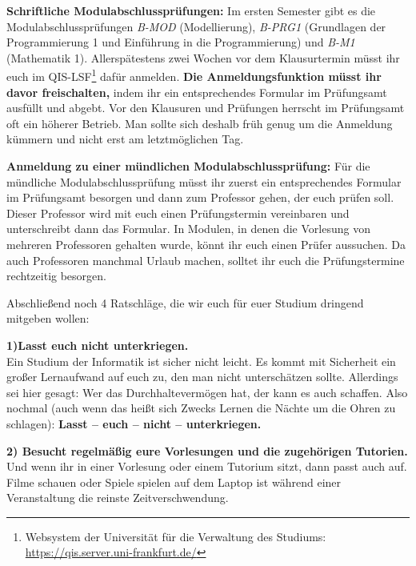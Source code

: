 \textbf{Schriftliche Modulabschlussprüfungen:} Im ersten Semester gibt es die Modulabschlussprüfungen \emph{B-MOD} (Modellierung), \emph{B\hbox{-}PRG1} (Grundlagen der Programmierung 1 und Einführung in die Programmierung) und \emph{B-M1} (Mathematik 1).
Allerspätestens zwei Wochen vor dem Klausurtermin müsst ihr euch im QIS-LSF\footnote{Websystem der Universität für die Verwaltung des Studiums: \href{https://qis.server.uni-frankfurt.de/}{https://qis.server.uni-frankfurt.de/}} dafür anmelden. \textbf{Die Anmeldungsfunktion müsst ihr davor freischalten,} indem ihr ein entsprechendes Formular im Prüfungsamt ausfüllt und abgebt. Vor den Klausuren und Prüfungen herrscht im Prüfungsamt oft ein höherer Betrieb. Man sollte sich deshalb früh genug um die Anmeldung kümmern und nicht erst am letztmöglichen Tag.


\textbf{Anmeldung zu einer mündlichen Modulabschlussprüfung:} Für die mündliche Modulabschlussprüfung müsst ihr zuerst ein entsprechendes Formular im Prüfungsamt besorgen und dann zum Professor gehen, der euch prüfen soll. Dieser Professor wird mit euch einen Prüfungstermin vereinbaren und unterschreibt dann das Formular. In Modulen, in denen die Vorlesung von mehreren Professoren gehalten wurde, könnt ihr euch einen Prüfer aussuchen. Da auch Professoren manchmal Urlaub machen, solltet ihr euch die Prüfungstermine rechtzeitig besorgen.

Abschließend noch 4 Ratschläge, die wir euch für euer Studium dringend mitgeben wollen:

\textbf{1)Lasst euch nicht unterkriegen.}\\
Ein Studium der Informatik ist sicher nicht leicht. Es kommt mit Sicherheit ein großer Lernaufwand auf euch zu, den man nicht unterschätzen sollte. Allerdings sei hier gesagt: Wer das Durchhaltevermögen hat, der kann es auch schaffen.
Also nochmal (auch wenn das heißt sich Zwecks Lernen die Nächte um die Ohren zu schlagen): \textbf{Lasst – euch – nicht – unterkriegen.}

\textbf{2) Besucht regelmäßig eure Vorlesungen und die zugehörigen Tutorien.}\\
Und wenn ihr in einer Vorlesung oder einem Tutorium sitzt, dann passt auch auf. Filme schauen oder Spiele spielen auf dem Laptop ist während einer Veranstaltung die reinste Zeitverschwendung.

